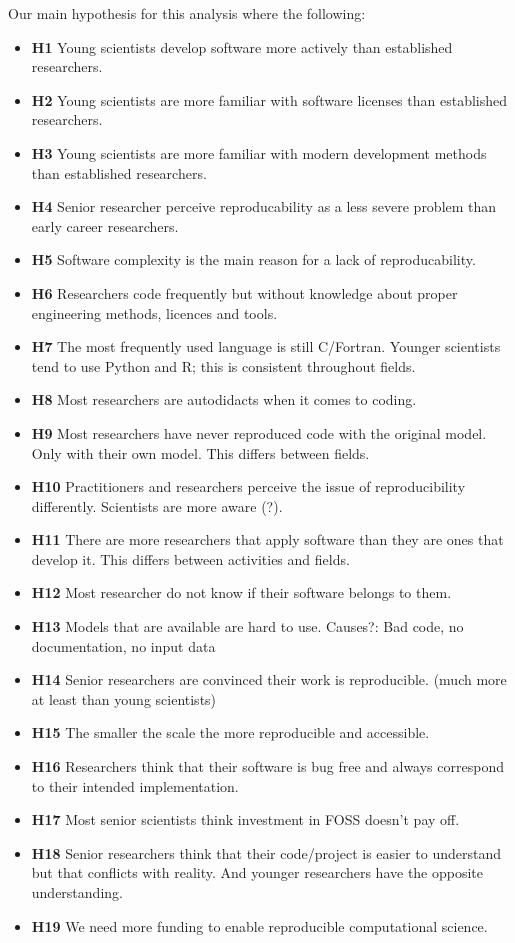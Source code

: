 \documentclass{article}
\begin{document}
Our main hypothesis for this analysis where the following:
\begin{itemize}
	\item \textbf{H1} Young scientists develop software more actively than established researchers.
	\item \textbf{H2} Young scientists are more familiar with software licenses than established researchers. 
	\item \textbf{H3} Young scientists are more familiar with modern development methods than established researchers. 
	\item \textbf{H4} Senior researcher perceive reproducability as a less severe problem than early career researchers.
 	\item \textbf{H5} Software complexity is the main reason for a lack of reproducability.
 	\item \textbf{H6} Researchers code frequently but without knowledge about proper engineering methods, licences and tools. 
 	\item \textbf{H7} The most frequently used language is still C/Fortran. Younger scientists tend to use Python and R; this is consistent throughout fields.
 	\item \textbf{H8} Most researchers are autodidacts when it comes to coding. 
 	\item \textbf{H9} Most researchers have never reproduced code with the original model. Only with their own model. This differs between fields. 
 	\item \textbf{H10} Practitioners and researchers perceive the issue of reproducibility differently. Scientists are more aware (?). 
	\item \textbf{H11} There are more researchers that apply software than they are ones that develop it. This differs between activities and fields. 
 	\item \textbf{H12} Most researcher do not know if their software belongs to them. 
 	\item \textbf{H13} Models that are available are hard to use. Causes?: Bad code, no documentation, no input data 
 	\item \textbf{H14} Senior researchers are convinced their work is reproducible. (much more at least than young scientists) 
 	\item \textbf{H15} The smaller the scale the more reproducible and accessible. 
 	\item \textbf{H16} Researchers think that their software is bug free and always correspond to their intended implementation. 
 	\item \textbf{H17} Most senior scientists think investment in FOSS doesn’t pay off. 
 	\item \textbf{H18} Senior researchers think that their code/project is easier to understand but that conflicts with reality. And younger researchers have the opposite understanding. 
 	\item \textbf{H19} We need more funding to enable reproducible computational science. 
\end{itemize}
\end{document}
